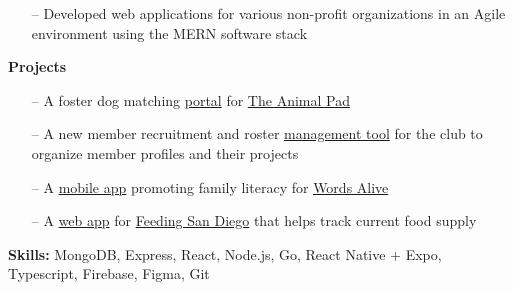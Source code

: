 


\begin{itemize}
    \item[--] Developed web applications for various non-profit organizations in an Agile environment using the MERN software stack
\end{itemize}

\smallskip
\textbf{Projects}\\
\begin{itemize}
    \item[--] A foster dog matching \href{https://github.com/TritonSE/TAP-Foster-Dog-Matching}{portal} for \href{https://theanimalpad.org}{The Animal Pad}
    \item[--] A new member recruitment and roster \href{https://github.com/TritonSE/TSE-Oktavian}{management tool} for the club to organize member profiles and their projects
    \item[--] A \href{https://github.com/TritonSE/WA-Family-Literacy-Application}{mobile app} promoting family literacy for \href{https://www.wordsalive.org}{Words Alive}
    \item[--] A \href{https://github.com/TritonSE/FSD-Supply-Chain}{web app} for \href{https://feedingsandiego.org}{Feeding San Diego} that helps track current food supply
\end{itemize}

\smallskip
\textbf{Skills:} MongoDB, Express, React, Node.js, Go, React Native + Expo, Typescript, Firebase, Figma, Git




